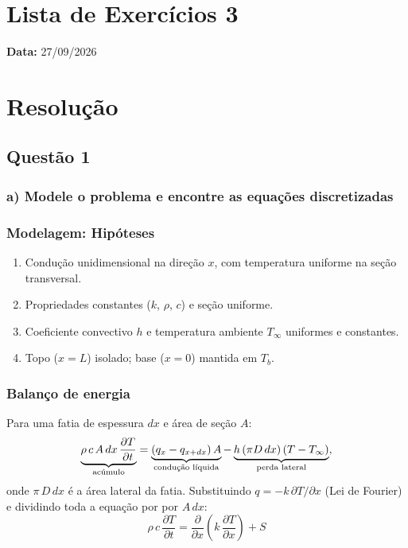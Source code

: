 \section*{Lista de Exercícios 3}

\noindent \textbf{Data:} 27/09/2026

\section*{Resolução}
\subsection*{Questão 1}
\subsubsection*{a) Modele o problema e encontre as equações discretizadas}

\subsubsection*{Modelagem: Hip\'oteses}

\begin{enumerate}
  \item Condu\c{c}\~ao unidimensional na dire\c{c}\~ao $x$, com temperatura uniforme na se\c{c}\~ao transversal.
  \item Propriedades constantes ($k$, $\rho$, $c$) e se\c{c}\~ao uniforme.
  \item Coeficiente convectivo $h$ e temperatura ambiente $T_\infty$ uniformes
        e constantes.
  \item Topo ($x=L$) isolado; base ($x=0$) mantida em $T_b$.
\end{enumerate}

\subsubsection*{Balan\c{c}o de energia}

Para uma fatia de espessura $dx$ e \'area de se\c{c}\~ao $A$:
\[
  \underbrace{\rho\, c\,A\,dx\,\frac{\partial T}{\partial t}}_{\text{ac\'umulo}} =\underbrace{\left(q_x-q_{x+dx}\right)A}_{\text{condu\c{c}\~ao l\'{\i}quida}} -\underbrace{h\,(\pi D\,dx)\,(T-T_\infty)}_{\text{perda lateral}},
\]
onde $\pi\,D\,dx$ \'e a \'area lateral da fatia. Substituindo $q=-k\,\partial T/\partial x$ (Lei de Fourier) e dividindo toda a equação por por $A\,dx$:
\begin{equation}
  \rho\, c\,\frac{\partial T}{\partial t} =\frac{\partial}{\partial x}\!\left(k\,\frac{\partial T}{\partial x}\right) + S
    \label{eq:edp}
\end{equation}

